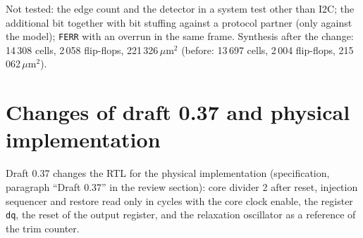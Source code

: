 \documentclass[10pt,a4paper]{article}
\begin{document}
Not tested: the edge count and the detector in a system test other than I2C; the additional bit together with
bit stuffing against a protocol partner (only against the model); \texttt{FERR} with an overrun in the same
frame. Synthesis after the change: 14\,308 cells, 2\,058 flip-flops, 221\,326\,$\mu$m$^2$ (before: 13\,697 cells,
2\,004 flip-flops, 215\,062\,$\mu$m$^2$).

\section{Changes of draft 0.37 and physical implementation}\label{sec:v037}

Draft 0.37 changes the RTL for the physical implementation (specification, paragraph ``Draft 0.37'' in the
review section): core divider 2 after reset, injection sequencer and restore read only in cycles with the
core clock enable, the register \texttt{dq}, the reset of the output register, and the relaxation oscillator
as a reference of the trim counter.
\end{document}
